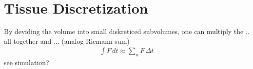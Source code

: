 \section{Tissue Discretization}
% 
By deviding the volume into small diskreticed subvolumes, one can multiply the .. all together and ... (analog Riemann sum)
\begin{align}
    \int F \, dt \approx \sum_n F \, \Delta t
\end{align}
see simulation?
% 
% 
